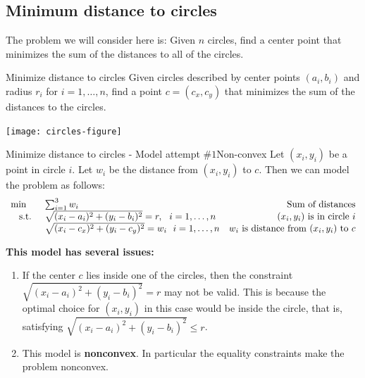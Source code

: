 \documentclass[../open-optimization/open-optimization.tex]{subfiles}
\begin{document}
\subsection{Minimum distance to circles}

The problem we will consider here is:
Given $n$ circles, find a center point that minimizes the sum of the distances to all of the circles. 

\begin{general}{Minimize distance to circles}{}%
Given circles described by center points $(a_i, b_i)$ and radius $r_i$ for $i=1, \dots, n$, find a point $c = (c_x,c_y)$ that minimizes the sum of the distances to the circles.  \\
\end{general}

\begin{center}
\texttt{[image: circles-figure]}
\end{center}

\begin{general}{Minimize distance to circles - Model attempt $\#1$}{Non-convex}
Let $(x_i,y_i)$ be a point in circle $i$.  Let $w_i$ be the distance from $(x_i, y_i)$ to $c$.  Then we can  model the problem as follows:
\begin{equation}
\begin{array}{rlr}
\min \quad & \sum_{i=1}^3 w_i \hfill & \text{ Sum of distances}\\
\text{ s.t. } &  \sqrt{(x_i - a_i)^2  + (y_i - b_i)^2}  = r , \ \ i=1,\dots, n& \text{ $(x_i, y_i)$ is in circle $i$}\\
& \sqrt{(x_i - c_x)^2 + (y_i - c_y)^2} = w_i \ \ i=1, \dots, n & \text{$w_i$ is distance from $(x_i, y_i)$ to $c$}\\
\end{array}
\end{equation}
\end{general}

\textbf{This model has several issues:}
\begin{enumerate}
\item  If the center $c$ lies inside one of the circles, then the constraint  $\sqrt{(x_i - a_i)^2  + (y_i - b_i)^2}  = r$ may not be valid.  This is because the optimal choice for $(x_i,y_i)$ in this case would be inside the circle, that is, satisfying $ \sqrt{(x_i - a_i)^2  + (y_i - b_i)^2}  \leq r$.
\item This model is \textbf{nonconvex}.  In particular the equality constraints make the problem nonconvex.
\end{enumerate}
\end{document}
